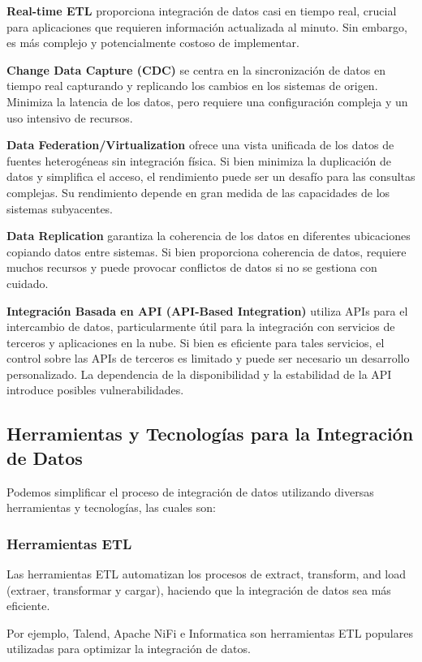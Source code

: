 \documentclass[12pt]{book}
\begin{document}
\noindent \textbf{Real-time ETL} proporciona integración de datos casi en tiempo real, crucial para aplicaciones que requieren información actualizada al minuto. Sin embargo, es más complejo y potencialmente costoso de implementar.

\noindent \textbf{Change Data Capture (CDC)} se centra en la sincronización de datos en tiempo real capturando y replicando los cambios en los sistemas de origen. Minimiza la latencia de los datos, pero requiere una configuración compleja y un uso intensivo de recursos.

\noindent \textbf{Data Federation/Virtualization} ofrece una vista unificada de los datos de fuentes heterogéneas sin integración física. Si bien minimiza la duplicación de datos y simplifica el acceso, el rendimiento puede ser un desafío para las consultas complejas. Su rendimiento depende en gran medida de las capacidades de los sistemas subyacentes.

\noindent \textbf{Data Replication} garantiza la coherencia de los datos en diferentes ubicaciones copiando datos entre sistemas. Si bien proporciona coherencia de datos, requiere muchos recursos y puede provocar conflictos de datos si no se gestiona con cuidado.

\noindent \textbf{Integración Basada en API (API-Based Integration)} utiliza APIs para el intercambio de datos, particularmente útil para la integración con servicios de terceros y aplicaciones en la nube. Si bien es eficiente para tales servicios, el control sobre las APIs de terceros es limitado y puede ser necesario un desarrollo personalizado. La dependencia de la disponibilidad y la estabilidad de la API introduce posibles vulnerabilidades.

\subsection{Herramientas y Tecnologías para la Integración de Datos}
Podemos simplificar el proceso de integración de datos utilizando diversas herramientas y tecnologías, las cuales son:

\subsubsection{Herramientas ETL}
Las herramientas ETL automatizan los procesos de extract, transform, and load (extraer, transformar y cargar), haciendo que la integración de datos sea más eficiente.

Por ejemplo, Talend, Apache NiFi e Informatica son herramientas ETL populares utilizadas para optimizar la integración de datos.
\end{document}
